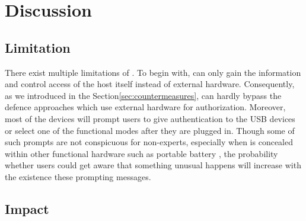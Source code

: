 \section{Discussion}
\label{sec:discussion}

\subsection{Limitation}
There exist multiple limitations of \tool.
To begin with, \tool can only gain the information and control access of the host itself instead of external hardware.
Consequently, as we introduced in the Section\ref{sec:countermeasures}, \tool can hardly bypass the defence approaches which use external hardware for authorization.
Moreover, most of the devices will prompt users to give authentication to the USB devices or select one of the functional modes after they are plugged in.
Though some of such prompts are not conspicuous for non-experts, especially when \tool is concealed within other functional hardware such as portable battery , the probability whether users could get aware that something unusual happens will increase with the existence these prompting messages.

\subsection{Impact}
